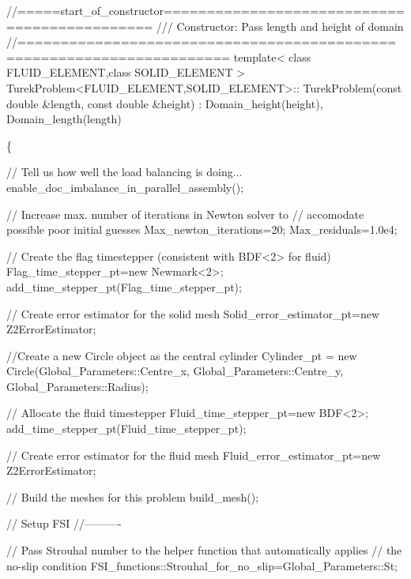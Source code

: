  
\begin{DoxyCodeInclude}
\textcolor{comment}{//=====start\_of\_constructor============================================= }
\textcolor{comment}{/// Constructor: Pass length and height of domain}
\textcolor{comment}{}\textcolor{comment}{//====================================================================== }
\textcolor{keyword}{template}< \textcolor{keyword}{class} FLUID\_ELEMENT,\textcolor{keyword}{class} SOLID\_ELEMENT >
TurekProblem<FLUID\_ELEMENT,SOLID\_ELEMENT>::
TurekProblem(\textcolor{keyword}{const} \textcolor{keywordtype}{double} &length,
             \textcolor{keyword}{const} \textcolor{keywordtype}{double} &height) :  Domain\_height(height),
                                      Domain\_length(length)
 
\{

 \textcolor{comment}{// Tell us how well the load balancing is doing...}
 enable\_doc\_imbalance\_in\_parallel\_assembly();

 \textcolor{comment}{// Increase max. number of iterations in Newton solver to}
 \textcolor{comment}{// accomodate possible poor initial guesses}
 Max\_newton\_iterations=20;
 Max\_residuals=1.0e4;

 \textcolor{comment}{// Create the flag timestepper (consistent with BDF<2> for fluid)}
 Flag\_time\_stepper\_pt=\textcolor{keyword}{new} Newmark<2>;
 add\_time\_stepper\_pt(Flag\_time\_stepper\_pt); 

 \textcolor{comment}{// Create error estimator for the solid mesh}
 Solid\_error\_estimator\_pt=\textcolor{keyword}{new} Z2ErrorEstimator;

 \textcolor{comment}{//Create a new Circle object as the central cylinder}
 Cylinder\_pt = \textcolor{keyword}{new} Circle(Global\_Parameters::Centre\_x,
                          Global\_Parameters::Centre\_y,
                          Global\_Parameters::Radius);
 
 \textcolor{comment}{// Allocate the fluid timestepper}
 Fluid\_time\_stepper\_pt=\textcolor{keyword}{new} BDF<2>;
 add\_time\_stepper\_pt(Fluid\_time\_stepper\_pt);

 \textcolor{comment}{// Create error estimator for the fluid mesh}
 Fluid\_error\_estimator\_pt=\textcolor{keyword}{new} Z2ErrorEstimator;

 \textcolor{comment}{// Build the meshes for this problem}
 build\_mesh();

 \textcolor{comment}{// Setup FSI}
 \textcolor{comment}{//----------}
 
 \textcolor{comment}{// Pass Strouhal number to the helper function that automatically applies}
 \textcolor{comment}{// the no-slip condition}
 FSI\_functions::Strouhal\_for\_no\_slip=Global\_Parameters::St;


\end{DoxyCodeInclude}
